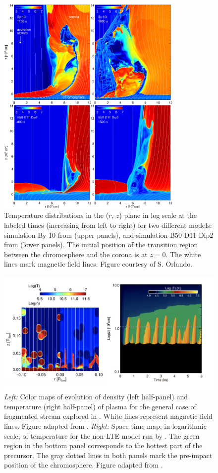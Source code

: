 \begin{figure}[t]
    \centering
    \includegraphics[width=9cm]{figs/accretion.pdf}
    \caption{Temperature distributions in the ($r$, $z$) plane in log scale at the labeled times (increasing from left to right) for two different models: simulation By-10 from \cite{Orlando_2010} (upper panels), and simulation B50-D11-Dip2 from \cite{Orlando_2013} (lower panels). The initial position of the transition region between the chromosphere and the corona is at $z = 0$. The white lines mark magnetic field lines. Figure courtesy of S. Orlando.}
    \label{fig:accretion}
\end{figure}

\begin{figure}[t]
    \centering
    \includegraphics[width=12cm]{figs/colombo.png}
    \caption{\emph{Left:} Color maps of evolution of density (left half-panel) and temperature (right half-panel) of plasma for the general case of fragmented stream explored in \cite{Colombo_2016}. White lines represent magnetic field lines. Figure adapted from \cite{Colombo_2016}. 
    \emph{Right:} Space-time map, in logarithmic scale, of temperature for the non-LTE model run by \cite{Colombo_2019b}. The green region in the
    bottom panel corresponds to the hottest part of the precursor. The gray
    dotted lines in both panels mark the pre-impact position of the 
    chromosphere. Figure adapted from \cite{Colombo_2019b}.}
    \label{fig:colombo}
\end{figure}

